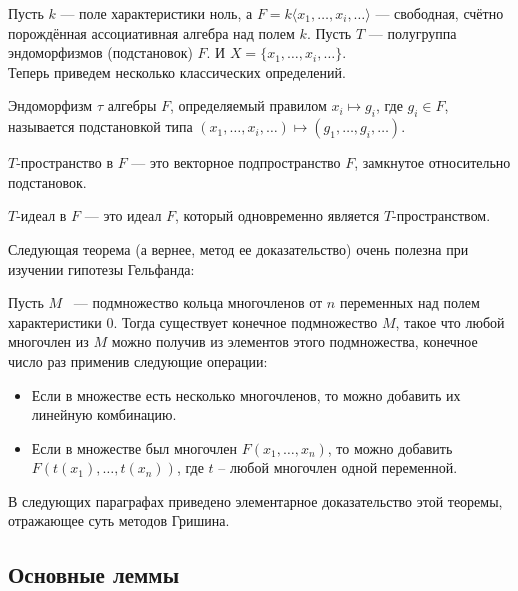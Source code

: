 Пусть $k$ — поле характеристики ноль, а $F = k\langle x_1, \ldots, x_i, \ldots \rangle$ — свободная, счётно порождённая ассоциативная алгебра над полем $k$.
Пусть $T$ — полугруппа эндоморфизмов (подстановок) $F$.
И $X = \{ x_1, \ldots, x_i, \ldots \}$.\\
Теперь приведем несколько классических определений.

\vskip 0.1in\noindent
\begin{definition}
    Эндоморфизм $\tau$ алгебры $F$, определяемый правилом $x_i \mapsto g_i$, где $g_i \in F$, называется подстановкой типа $(x_1, \ldots, x_i, \ldots) \mapsto (g_1, \ldots, g_i, \ldots)$.
\end{definition}
\vskip 0.1in\noindent

\vskip 0.1in\noindent
\begin{definition}
    $T$-пространство в $F$ — это векторное подпространство $F$, замкнутое относительно подстановок.
\end{definition}
\vskip 0.1in\noindent

\vskip 0.1in\noindent
\begin{definition}
    $T$-идеал в $F$ — это идеал $F$, который одновременно является $T$-пространством.
\end{definition}
\vskip 0.1in\noindent

Следующая теорема (а вернее, метод ее доказательство) очень полезна при изучении гипотезы Гельфанда:
\vskip 0.1in\noindent
\begin{theorem}
    \label{main}
    Пусть $M$ ~--- подмножество кольца многочленов от $n$ переменных над полем характеристики 0.
    Тогда существует конечное подмножество $M$, такое что любой многочлен из $M$ можно получив из элементов этого подмножества, конечное число раз применив следующие операции:
    \begin{itemize}
        \item Если в множестве есть несколько многочленов, то можно добавить их линейную комбинацию.
        \item Если в множестве был многочлен $F(x_1,\ldots,x_n)$, то можно добавить $F(t(x_1),\ldots,t(x_n))$, где $t$ -- любой многочлен одной переменной.
    \end{itemize}
\end{theorem}
\vskip 0.1in\noindent
В следующих параграфах приведено элементарное доказательство этой теоремы, отражающее суть методов Гришина.

\subsection{Основные леммы}\label{subsec:grishin-main-lemmas}

